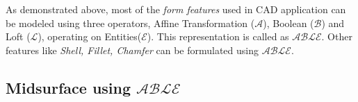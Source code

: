 As demonstrated above, most of the {\em form features} used in CAD application can be modeled using  three operators, Affine Transformation ($\mathcal{A}$),  Boolean ($\mathcal{B}$) and Loft ($\mathcal{L}$), operating on Entities($\mathcal{E}$). This representation is called as {\bf $\mathcal{ABLE}$}.  Other features like {\em Shell, Fillet, Chamfer} can be formulated using {\bf $\mathcal{ABLE}$}. 

%



\subsection{Midsurface using $\mathcal{ABLE}$}

